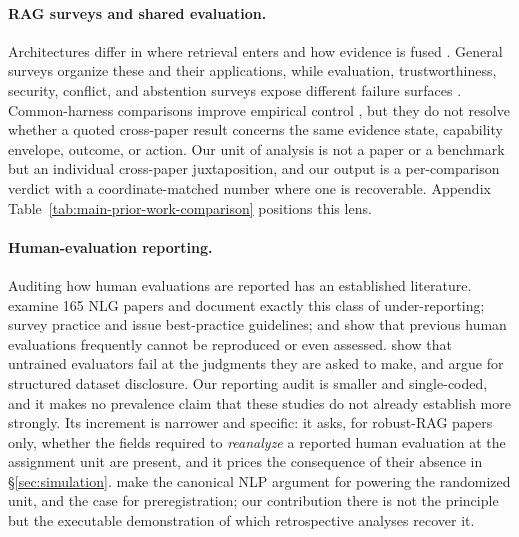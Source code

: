 \documentclass[11pt]{article}
\begin{document}
\paragraph{RAG surveys and shared evaluation.}
Architectures differ in where retrieval enters and how evidence is fused
\citep{drqa2017,knnlm2020,fid2021,retro2022,atlas2023,replug2024}. General
surveys organize these and their applications, while evaluation,
trustworthiness, security, conflict, and abstention surveys expose different
failure surfaces \citep{ragSurvey2024,ragEvaluationSurvey2024,
trustRAGCompass2024,securityRAGSurvey2026,xuKnowledgeConflicts2024,
wenAbstentionSurvey2025}. Common-harness comparisons improve empirical control
\citep{ragBestPractices2024,alushiRAGComparison2026}, but they do not resolve
whether a quoted cross-paper result concerns the same evidence state,
capability envelope, outcome, or action. Our unit of analysis is not a paper
or a benchmark but an individual cross-paper juxtaposition, and our output is
a per-comparison verdict with a coordinate-matched number where one is
recoverable. Appendix Table~\ref{tab:main-prior-work-comparison} positions
this lens.

\paragraph{Human-evaluation reporting.}
Auditing how human evaluations are reported has an established literature.
\citet{howcroft2020twenty} examine 165 NLG papers and document exactly this
class of under-reporting; \citet{vanderlee2021human} survey practice and issue
best-practice guidelines; \citet{belz2021systematic} and
\citet{belz2023impossibility} show that previous human evaluations frequently
cannot be reproduced or even assessed. \citet{clark2021human} show that
untrained evaluators fail at the judgments they are asked to make, and
\citet{bender2018datastatements} argue for structured dataset disclosure. Our
reporting audit is smaller and single-coded, and it makes no prevalence claim
that these studies do not already establish more strongly. Its increment is
narrower and specific: it asks, for robust-RAG papers only, whether the fields
required to \emph{reanalyze} a reported human evaluation at the assignment
unit are present, and it prices the consequence of their absence in
\S\ref{sec:simulation}. \citet{card2020power} make the canonical NLP argument
for powering the randomized unit, and \citet{vanmiltenburg2021preregistering}
the case for preregistration; our contribution there is not the principle but
the executable demonstration of which retrospective analyses recover it.
\end{document}
